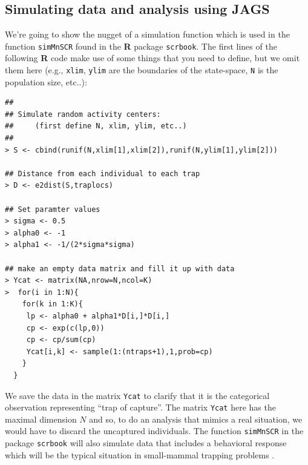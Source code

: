 \subsection{Simulating data and analysis using JAGS}

We're going to show the nugget of a simulation function which is used
in the function \mbox{\tt simMnSCR} found in the {\bf R} package
\mbox{\tt scrbook}.  The first lines of the following {\bf R} code
make use of some things that you need to define, but we omit them here
(e.g., \mbox{\tt xlim}, \mbox{\tt ylim} are the boundaries of the
state-space, \mbox{\tt N} is the population size, etc..): 
{\small
\begin{verbatim}
##
## Simulate random activity centers:
##     (first define N, xlim, ylim, etc..)
##
> S <- cbind(runif(N,xlim[1],xlim[2]),runif(N,ylim[1],ylim[2]))

## Distance from each individual to each trap
> D <- e2dist(S,traplocs)

## Set paramter values
> sigma <- 0.5
> alpha0 <- -1
> alpha1 <- -1/(2*sigma*sigma)

## make an empty data matrix and fill it up with data
> Ycat <- matrix(NA,nrow=N,ncol=K)
>  for(i in 1:N){
    for(k in 1:K){
     lp <- alpha0 + alpha1*D[i,]*D[i,]
     cp <- exp(c(lp,0))
     cp <- cp/sum(cp)
     Ycat[i,k] <- sample(1:(ntraps+1),1,prob=cp)
    }
  }
\end{verbatim}
} 
We save the data in the matrix \mbox{\tt Ycat} to clarify that it is
the categorical observation representing ``trap of capture''.  The
matrix \mbox{\tt Ycat} here has the maximal dimension $N$ and so, to
do an analysis that mimics a real situation, we would have to discard
the uncaptured individuals.  The function \mbox{\tt simMnSCR} in the
package \mbox{\tt scrbook} will also simulate data that includes a
behavioral response which will be the typical situation in
small-mammal trapping problems \citep[see][for
details]{converse_royle:2012}.

